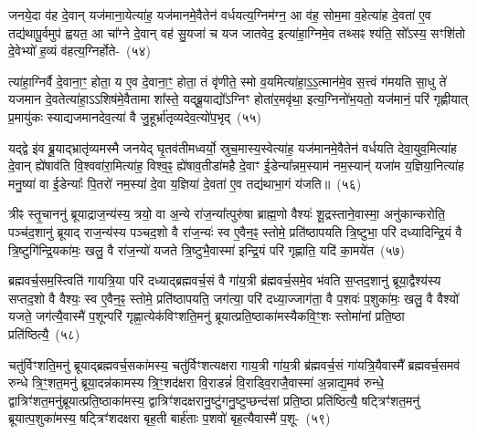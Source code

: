 जनये॒दा व॑ह दे॒वान् यज॑माना॒येत्या॑ह॒ यज॑मानमे॒वैतेन॑ वर्ध\-य\-त्य॒\-ग्नि\-म॑ग्न॒ आ व॑ह॒ सोम॒मा व॒हेत्या॑ह दे॒वता॑ ए॒व तद्य॑थापू॒र्वमुप॑ ह्वयत॒ आ चा᳚ग्ने दे॒वान् वह॑ सु॒यजा॑ च यज जातवेद॒ इत्या॑हा॒ग्निमे॒व तथ्सꣴ श्य॑ति॒ सो᳚\-ऽस्य॒ सꣳशि॑तो दे॒वेभ्यो॑ ह॒व्यं व॑हत्य॒ग्निर्\mbox{}होते-~(५४)\ip

त्या॑हा॒ग्निर्वै दे॒वाना॒ꣳ॒ होता॒ य ए॒व दे॒वाना॒ꣳ॒ होता॒ तं वृ॑णीते॒ स्मो व॒यमित्या॑हा॒\-ऽ॒\-ऽ॒त्मान॑मे॒व स॒त्त्वं ग॑मयति सा॒धु ते॑ यजमान दे॒वतेत्या॑हा॒\-ऽऽ\-शिष॑मे॒वैतामा शा᳚स्ते॒ यद्ब्रू॒याद्यो᳚\-ऽग्निꣳ होता॑र॒मवृ॑था॒ इत्य॒ग्निनो॑भ॒यतो॒ यज॑मानं॒ परि॑ गृह्णीयात् प्र॒मायु॑कः स्याद्यजमानदेव॒त्या॑ वै जु॒हूर्भ्रा॑तृव्यदेव॒त्यो॑प॒भृद्~(५५)\ip

यद्द्वे इ॑व ब्रू॒याद्भ्रातृ॑व्यमस्मै जनयेद् घृ॒तव॑तीमध्वर्यो॒ स्रुच॒मास्य॒\-स्वे\-त्या॑ह॒ यज॑मानमे॒वैतेन॑ वर्धयति देवा॒युव॒मित्या॑ह दे॒वान् ह्ये॑षा\-व॑ति वि॒श्व\-वा॑रा॒मित्या॑ह॒ विश्व॒ꣴ॒ ह्ये॑षाव॒तीडा॑महै दे॒वाꣳ ई॒डेन्या᳚न्नम॒स्याम॑ नम॒स्यान्॑ यजा॑म य॒ज्ञिया॒नित्या॑ह मनु॒ष्या॑ वा ई॒डेन्याः᳚ पि॒तरो॑ नम॒स्या॑ दे॒वा य॒ज्ञिया॑ दे॒वता॑ ए॒व तद्य॑थाभा॒गं य॑जति॥~(५६)\ip

{\anuvakamend[{विप्रा॑नुमदित॒ इत्या॑ह च॒नास्मै॒ होतो॑प॒भृद्दे॒वता॑ ए॒व त्रीणि॑ च}]}

त्रीꣴ स्तृ॒चाननु॑ ब्रूयाद्राज॒न्य॑स्य॒ त्रयो॒ वा अ॒न्ये रा॑ज॒न्या᳚त्पुरु॑षा ब्राह्म॒णो वैश्यः॑ शू॒द्रस्ताने॒वास्मा॒ अनु॑कान्करोति॒ पञ्च॑द॒शानु॑ ब्रूयाद् राज॒न्य॑स्य पञ्चद॒शो वै रा॑ज॒न्यः॑ स्व ए॒वैन॒ꣴ॒ स्तोमे॒ प्रति॑\-ष्ठापयति त्रि॒ष्टुभा॒ परि॑ दध्यादिन्द्रि॒यं वै त्रि॒ष्टुगि॑न्द्रि॒यका॑मः॒ खलु॒ वै रा॑ज॒न्यो॑ यजते त्रि॒ष्टुभै॒वास्मा॑ इन्द्रि॒यं परि॑ गृह्णाति॒ यदि॑ का॒मये॑त~(५७)\ip

ब्रह्मवर्च॒सम॒स्त्विति॑ गायत्रि॒या परि॑ दध्याद्ब्रह्मवर्च॒सं वै गा॑य॒त्री ब्र॑ह्मवर्च॒समे॒व भ॑वति स॒प्तद॒शानु॑ ब्रूया॒द्वैश्य॑स्य सप्तद॒शो वै वैश्यः॒ स्व ए॒वैन॒ꣴ॒ स्तोमे॒ प्रति॑\-ष्ठापयति॒ जग॑त्या॒ परि॑ दध्या॒ज्जाग॑ता॒ वै प॒शवः॑ प॒शुका॑मः॒ खलु॒ वै वैश्यो॑ यजते॒ जग॑त्यै॒वास्मै॑ प॒शून्परि॑ गृह्णा॒त्येक॑विꣳशति॒मनु॑ ब्रूयात्प्रति॒ष्ठाका॑मस्यैकवि॒ꣳ॒शः स्तोमा॑नां प्रति॒ष्ठा प्रति॑ष्ठित्यै॒~(५८)\ip

चतु॑र्विꣳशति॒मनु॑ ब्रूयाद्ब्रह्मवर्च॒सका॑मस्य॒ चतु॑र्विꣳशत्यक्षरा गाय॒त्री गा॑य॒त्री ब्र॑ह्मवर्च॒सं गा॑यत्रि॒यैवास्मै᳚ ब्रह्मवर्च॒समव॑ रुन्धे त्रि॒ꣳ॒शत॒\-मनु॑ ब्रूया॒दन्न॑कामस्य त्रि॒ꣳ॒शद॑क्षरा वि॒राडन्नं॑ वि॒राड्वि॒रा\-जै॒\-वा\-स्मा॑ अ॒न्नाद्\-य॒\-मव॑ रुन्धे॒ द्वात्रिꣳ॑शत॒\-मनु॑\-ब्रूयात्प्र\-ति॒ष्ठा\-का॑मस्य॒ द्वात्रिꣳ॑शद\-क्षरा\-नु॒ष्टु॑ग\-नु॒ष्टुप्छन्द॑सां प्रति॒ष्ठा प्रति॑ष्ठित्यै॒ षट्त्रिꣳ॑शत॒मनु॑ ब्रूयात्प॒शुका॑मस्य॒ षट्त्रिꣳ॑शदक्षरा बृह॒ती बार्\mbox{}ह॑ताः प॒शवो॑ बृह॒त्यैवास्मै॑ प॒शू-~(५९)\ip

